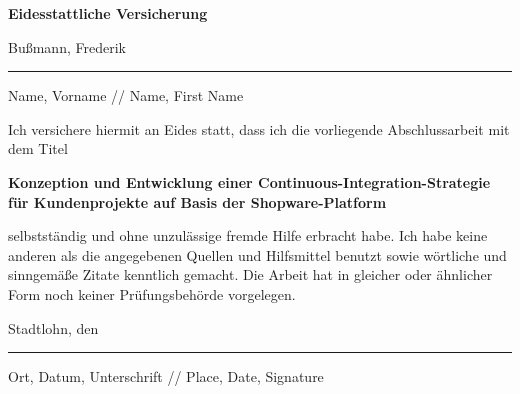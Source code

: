
\thispagestyle{empty}
    \begingroup
        \fontsize{18pt}{20pt}\selectfont
        {\bfseries Eidesstattliche Versicherung}
    \endgroup

    \vskip 0.8cm

    \begingroup
        \fontsize{12pt}{18pt}\selectfont
        Bußmann, Frederik
    \endgroup

    \vskip -0.35cm

    \noindent\rule{14cm}{0.4pt}

    \vskip -0.2cm

    \begingroup
        \fontsize{8pt}{6pt}\selectfont
        Name, Vorname // Name, First Name
    \endgroup

    \vskip 0.6cm
    \begingroup
        \fontsize{10.5pt}{11.5pt}\selectfont
        Ich versichere hiermit an Eides statt, dass ich die vorliegende Abschlussarbeit mit dem Titel
    \endgroup

    \vskip 0.3cm

    \begingroup
        \fontsize{12pt}{18pt}\selectfont
        {\bfseries Konzeption und Entwicklung einer Continuous-Integration-Strategie für Kundenprojekte auf Basis der
        Shopware-Platform}
    \endgroup

    \vskip 0.3cm

    \begingroup
        \fontsize{10.5pt}{11.5pt}\selectfont
        selbstständig und ohne unzulässige fremde Hilfe erbracht habe.
        Ich habe keine anderen als die angegebenen Quellen und Hilfsmittel benutzt sowie wörtliche und sinngemäße
        Zitate kenntlich gemacht.
        Die Arbeit hat in gleicher oder ähnlicher Form noch keiner Prüfungsbehörde vorgelegen.
    \endgroup

    \vskip 0.8cm
    {\fontsize{12pt}{18pt}\selectfont
    Stadtlohn, den}

    \vskip -0.35cm

    \noindent\rule{14cm}{0.4pt}

    \vskip -0.2cm

    \begingroup
        \fontsize{8pt}{6pt}\selectfont
        Ort, Datum, Unterschrift // Place, Date, Signature
    \endgroup
\restoregeometry
\clearpage
